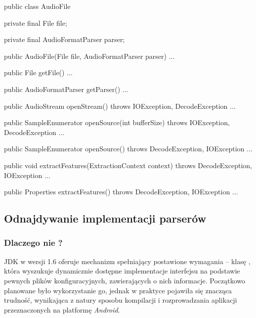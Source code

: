 \begin{java}
public class AudioFile {

    private final File file;

    private final AudioFormatParser parser;

    public AudioFile(File file, AudioFormatParser parser) { ... }

    public File getFile() { ... }

    public AudioFormatParser getParser() { ... }

    public AudioStream openStream() throws IOException, DecodeException { ... }

    public SampleEnumerator openSource(int bufferSize) throws IOException, DecodeException { ... }

    public SampleEnumerator openSource() throws DecodeException, IOException { ... }

    public void extractFeatures(ExtractionContext context) throws DecodeException, 
            IOException { ...}

    public Properties extractFeatures() throws DecodeException, IOException { ... }

}
\end{java}


\subsection{Odnajdywanie implementacji parserów}
\label{sec:odnajdywanie_implementacji}

\subsubsection{Dlaczego nie ?}
\label{sec:dlaczego_nie_service_loader}

JDK w wersji 1.6 oferuje mechanizm spełniający postawione wymagania -- klasę ,
która wyszukuje dynamicznie dostępne implementacje interfejsu na podstawie pewnych plików
konfiguracyjnych, zawierających o nich informacje. Początkowo planowane było wykorzystanie go,
jednak w praktyce pojawiła się znacząca trudność, wynikająca z natury sposobu kompilacji i
rozprowadzania aplikacji przeznaczonych na platformę \emph{Android}.

